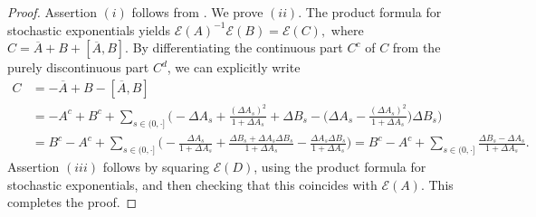 \documentclass[10pt]{article} %
\newcommand\cE{\mathcal E}
\begin{document}
\begin{proof}
Assertion $(i)$ follows from \cite[Lemma 4.4]{cohen2012existence}. We prove $(ii)$. The product formula for stochastic exponentials yields $\cE(A)^{-1}\cE(B) = \cE(C),$ where $C = \overline A + B + [\overline A,B]$. By differentiating the continuous part $C^c$ of $C$ from the purely discontinuous part $C^d$, we can explicitly write
\begin{align*}
			C &= -\overline A + B - [\overline A,B] \\
			&= -A^c + B^c + \sum_{s \in (0,\cdot]} \bigg(-\Delta A_s + \frac{(\Delta A_s)^2}{1+\Delta A_s} + \Delta B_s - \bigg(\Delta A_s - \frac{(\Delta A_s)^2}{1+\Delta A_s}\bigg)\Delta B_s\bigg) \\
			&= B^c - A^c + \sum_{s \in (0,\cdot]} \bigg(-\frac{\Delta A_s}{1+\Delta A_s} + \frac{\Delta B_s + \Delta A_s \Delta B_s}{1+\Delta A_s} - \frac{\Delta A_s \Delta B_s}{1+\Delta A_s}\bigg) = B^c - A^c + \sum_{s \in (0,\cdot]} \frac{\Delta B_s - \Delta A_s}{1+\Delta A_s}.
\end{align*}
Assertion $(iii)$ follows by squaring $\cE(D)$, using the product formula for stochastic exponentials, and then checking that this coincides with $\cE(A)$. This completes the proof.
\end{proof}
\end{document}
